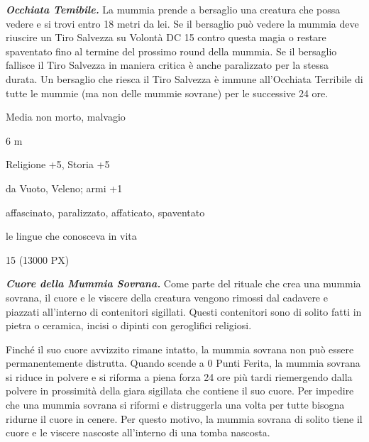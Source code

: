 \begin{multicols}{2}
{\emph{\textbf{Occhiata Temibile.}} La mummia prende a bersaglio una creatura che possa vedere e si trovi entro 18 metri da lei. Se il bersaglio può vedere la mummia deve riuscire un Tiro Salvezza su Volontà DC 15 contro questa magia o restare spaventato fino al termine del prossimo round della mummia. Se il bersaglio fallisce il Tiro Salvezza in maniera critica è anche paralizzato per la stessa durata. Un bersaglio che riesca il Tiro Salvezza è immune all'Occhiata Terribile di tutte le mummie (ma non delle mummie sovrane) per le successive 24 ore.

\begin{description}[noitemsep, topsep=0pt, parsep=0pt, partopsep=0pt, itemsep=1pt, leftmargin=2.35cm,  labelwidth=2.2cm, itemindent=0cm, listparindent=0pt] %
\setlength{\baselineskip}{10pt}
\item[\textbf{Taglia/Tipo}] Media non morto, malvagio
\item[\textbf{Caratt.}] 
\item[\textbf{Punti Ferita}] 
\item[\textbf{Movimento}] 6 m
\item[\textbf{Tiri Salvez.}] 
\item[\textbf{Comp.}] Religione +5, Storia +5
\item[\textbf{Imm. Danni}] da Vuoto, Veleno; armi +1
\item[\textbf{Immunità}] affascinato, paralizzato, affaticato, spaventato
\item[\textbf{Sensi}] 
\item[\textbf{Linguaggi}] le lingue che conosceva in vita
\item[\textbf{Sfida}] 15 (13000 PX)
\end{description}
\smallskip

\emph{\textbf{Cuore della Mummia Sovrana.}} Come parte del rituale che crea una mummia sovrana, il cuore e le viscere della creatura vengono rimossi dal cadavere e piazzati all'interno di contenitori sigillati. Questi contenitori sono di solito fatti in pietra o ceramica, incisi o dipinti con geroglifici religiosi.

Finché il suo cuore avvizzito rimane intatto, la mummia sovrana non può essere permanentemente distrutta. Quando scende a 0 Punti Ferita, la mummia sovrana si riduce in polvere e si riforma a piena forza 24 ore più tardi riemergendo dalla polvere in prossimità della giara sigillata che contiene il suo cuore. Per impedire che una mummia sovrana si riformi e distruggerla una volta per tutte bisogna ridurne il cuore in cenere. Per questo motivo, la mummia sovrana di solito tiene il cuore e le viscere nascoste all'interno di una tomba nascosta.

}
\end{multicols}
